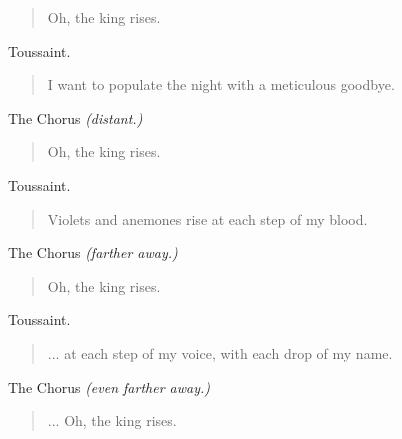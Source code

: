 \documentclass[letterpaper,article,12pt,oneside,notitlepage]{memoir}
\begin{document}
\begin{verse}
\hspace{1cm} Oh, the king rises. \\
\end{verse}

\begin{center}Toussaint.\end{center}

\begin{verse}
I want to populate the night with a meticulous goodbye. \\
\end{verse}

\clearpage

\begin{center}The Chorus \textit{(distant.)}\end{center}

\begin{verse}
Oh, the king rises. \\
\end{verse}

\begin{center}Toussaint.\end{center}

\begin{verse}
Violets and anemones rise at each step of my blood. \\
\end{verse}

\begin{center}The Chorus \textit{(farther away.)}\end{center}

\begin{verse}
Oh, the king rises. \\
\end{verse}

\begin{center}Toussaint.\end{center}

\begin{verse}
... at each step of my voice, with each drop of my name. \\
\end{verse}

\begin{center}The Chorus \textit{(even farther away.)}\end{center}

\begin{verse}
... Oh, the king rises. \\
\end{verse}
\end{document}
